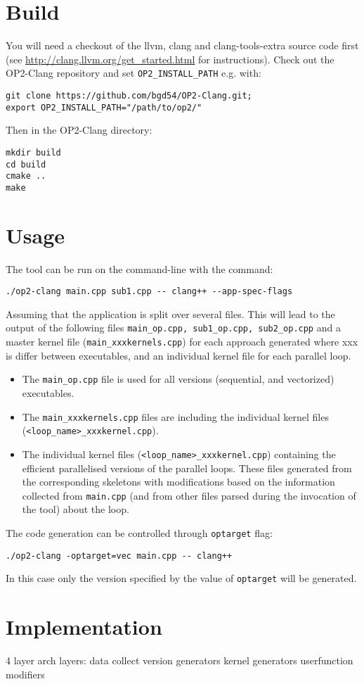 \documentclass{article}
\begin{document}
\section{Build}
You will need a checkout of the llvm, clang and clang-tools-extra source code first (see \url{http://clang.llvm.org/get_started.html} for instructions). Check out the OP2-Clang repository and set {\tt OP2\_INSTALL\_PATH} e.g. with:\\
\begin{lstlisting}
git clone https://github.com/bgd54/OP2-Clang.git;
export OP2_INSTALL_PATH="/path/to/op2/"
\end{lstlisting}
Then in the OP2-Clang directory:
\begin{lstlisting}
mkdir build
cd build
cmake ..
make
\end{lstlisting}

\section{Usage}
The tool can be run on the command-line with the command:
\begin{lstlisting}
./op2-clang main.cpp sub1.cpp -- clang++ --app-spec-flags
\end{lstlisting}
Assuming that the application is split over several files. This will lead to the output of the following files {\tt main\_op.cpp, sub1\_op.cpp, sub2\_op.cpp} and a master kernel file ({\tt main\_xxxkernels.cpp}) for each approach generated where xxx is differ between executables, and an individual kernel file for each parallel loop.
\begin{itemize}
    \item The {\tt main\_op.cpp} file is used for all versions (sequential, \omp and vectorized) executables.
    \item The {\tt main\_xxxkernels.cpp} files are including the individual kernel files ({\tt <loop\_name>\_xxxkernel.cpp}).
    \item The individual kernel files ({\tt <loop\_name>\_xxxkernel.cpp}) containing the efficient parallelised versions of the parallel loops. These files generated from the corresponding skeletons with modifications based on the information collected from {\tt main.cpp} (and from other files parsed during the invocation of the tool) about the loop.
\end{itemize}
The code generation can be controlled through {\tt optarget} flag:
\begin{lstlisting}
./op2-clang -optarget=vec main.cpp -- clang++
\end{lstlisting}
In this case only the version specified by the value of {\tt optarget} will be generated.

\section{Implementation}

4 layer arch
layers: data collect
version generators
kernel generators
userfunction modifiers
\end{document}
